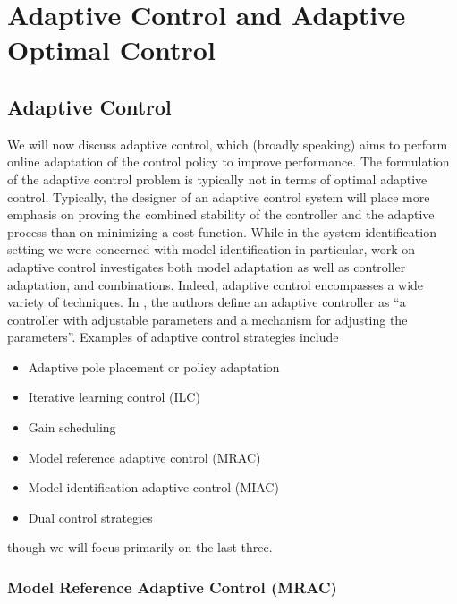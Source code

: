\chapter{Adaptive Control and Adaptive Optimal Control}


\section{Adaptive Control}

We will now discuss adaptive control, which (broadly speaking) aims to perform online adaptation of the control policy to improve performance. The formulation of the adaptive control problem is typically not in terms of optimal adaptive control. Typically, the designer of an adaptive control system will place more emphasis on proving the combined stability of the controller and the adaptive process than on minimizing a cost function. While in the system identification setting we were concerned with model identification in particular, work on adaptive control investigates both model adaptation as well as controller adaptation, and combinations. Indeed, adaptive control encompasses a wide variety of techniques. In \cite{aastrom2013adaptive}, the authors define an adaptive controller as ``a controller with adjustable parameters and a mechanism for adjusting the parameters''. Examples of adaptive control strategies include
\begin{itemize}
\item Adaptive pole placement or policy adaptation
\item Iterative learning control (ILC)
\item Gain scheduling
\item Model reference adaptive control (MRAC)
\item Model identification adaptive control (MIAC)
\item Dual control strategies
\end{itemize}
though we will focus primarily on the last three.

\subsection{Model Reference Adaptive Control (MRAC)}

